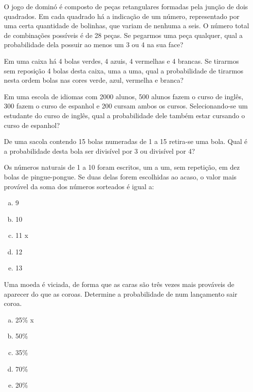  
			\item O jogo de dominó é composto de peças retangulares formadas pela junção de dois quadrados. Em cada quadrado há a indicação de um número, representado por uma certa quantidade de bolinhas, que variam de nenhuma a seis. O número total de combinações possíveis é de 28 peças. Se pegarmos uma peça qualquer, qual a probabilidade dela possuir ao menos um 3 ou 4 na sua face?

 
			\item Em uma caixa há 4 bolas verdes, 4 azuis, 4 vermelhas e 4 brancas. Se tirarmos sem reposição 4 bolas desta caixa, uma a uma, qual a probabilidade de tirarmos nesta ordem bolas nas cores verde, azul, vermelha e branca?

 
			\item Em uma escola de idiomas com 2000 alunos, 500 alunos fazem o curso de inglês, 300 fazem o curso de espanhol e 200 cursam ambos os cursos. Selecionando-se um estudante do curso de inglês, qual a probabilidade dele também estar cursando o curso de espanhol?

 
			\item De uma sacola contendo 15 bolas numeradas de 1 a 15 retira-se uma bola. Qual é a probabilidade desta bola ser divisível por 3 ou divisível por 4?
			
\item Os números naturais de 1 a 10 foram escritos, um a um, sem repetição, em dez bolas de pingue-pongue. Se duas delas forem escolhidas ao acaso, o valor mais provável da soma dos números sorteados é igual a:
\begin{multicols}{5}
\begin{enumerate}[a)]
	\item 9
	\item 10
	\item 11 x
	\item 12
	\item 13
\end{enumerate}
\end{multicols}

\item Uma moeda é viciada, de forma que as caras são três vezes mais prováveis de aparecer do que as coroas. Determine a probabilidade de num lançamento sair coroa.
\begin{multicols}{5}
\begin{enumerate}[a)]
	\item 25\% x
	\item 50\%
	\item 35\%
	\item 70\%
	\item 20\%
\end{enumerate}
\end{multicols}

